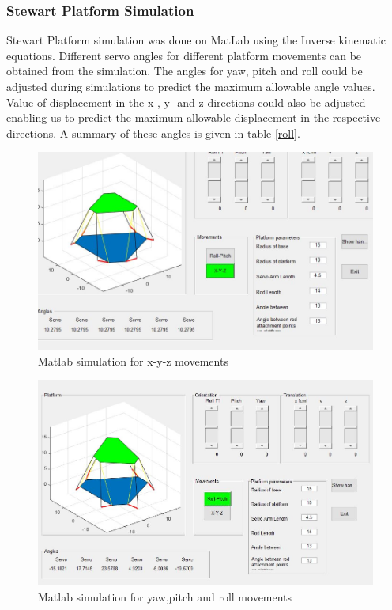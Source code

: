 \subsubsection{Stewart Platform Simulation}
Stewart Platform simulation was done on MatLab using the Inverse kinematic equations. Different servo angles for different platform movements can be obtained from the simulation. The angles for yaw, pitch and roll could be adjusted during simulations to predict the maximum allowable angle values. Value of displacement in the x-, y- and z-directions could also be adjusted enabling us to predict the maximum allowable displacement in the respective directions. A summary of these angles is given in table \ref{roll}.
\begin{center}
	\begin{figure}[H]
		\centering
		\includegraphics[width=0.75\linewidth]{Figures/Matlab}
		\caption[Linear displacements]{Matlab simulation for x-y-z movements}
	\end{figure}
\end{center}
\begin{center}
	\begin{figure}[H]
		\centering
		\includegraphics[width=0.75\linewidth]{Figures/Matlab2}
		\caption[Angular displacements]{Matlab simulation for yaw,pitch and roll movements}
	\end{figure}
\end{center}
